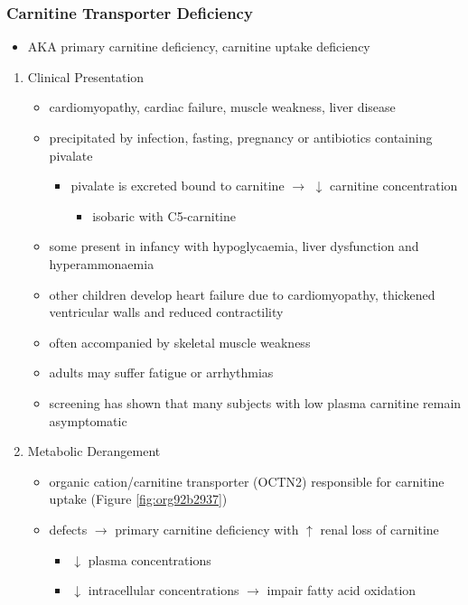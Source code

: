 \documentclass[12pt]{scrartcl}
\begin{document}
\subsubsection{Carnitine Transporter Deficiency}
\label{sec:org88c7ddc}
\begin{itemize}
\item AKA primary carnitine deficiency, carnitine uptake deficiency
\end{itemize}
\begin{enumerate}
\item Clinical Presentation
\label{sec:org51dfbbc}
\begin{itemize}
\item cardiomyopathy, cardiac failure, muscle weakness, liver disease
\item precipitated by infection, fasting, pregnancy or antibiotics containing pivalate
\begin{itemize}
\item pivalate is excreted bound to carnitine \(\to\) \(\downarrow\) carnitine concentration
\begin{itemize}
\item isobaric with C5-carnitine
\end{itemize}
\end{itemize}
\item some present in infancy with hypoglycaemia, liver dysfunction and hyperammonaemia
\item other children develop heart failure due to cardiomyopathy,
thickened ventricular walls and reduced contractility
\item often accompanied by skeletal muscle weakness
\item adults may suffer fatigue or arrhythmias
\item screening has shown that many subjects with low plasma carnitine remain asymptomatic
\end{itemize}
\item Metabolic Derangement
\label{sec:orgebbd5f9}
\begin{itemize}
\item organic cation/carnitine transporter (OCTN2) responsible for
carnitine uptake (Figure \ref{fig:org92b2937})
\item defects \(\to\) primary carnitine deficiency with \(\uparrow\) renal loss of carnitine
\begin{itemize}
\item \(\downarrow\) plasma concentrations
\item \(\downarrow\) intracellular concentrations \(\to\) impair fatty acid
oxidation
\end{itemize}
\end{itemize}


\end{enumerate}
\end{document}
